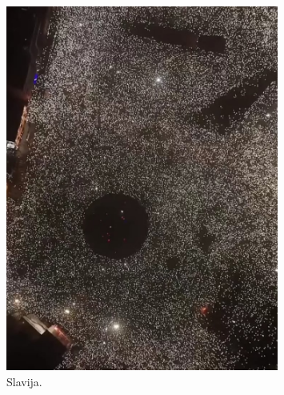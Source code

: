 \documentclass[a4paper,12pt]{article}
\begin{document}
\begin{figure}[H] 
	\centering 
	\includegraphics[width=0.8\textwidth]{../images/slavija-centar.jpeg} 
	\caption{Slavija.} 
	\label{fig:slavija} 
\end{figure}
\end{document}
